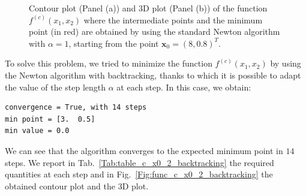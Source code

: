 \documentclass[a4paper,11pt]{article}
\begin{document}
	\begin{figure}[htb]
		\centering
		 \quad
		\caption{Contour plot (Panel (a)) and 3D plot (Panel (b)) of the function $f^{(c)}(x_{1},x_{2})$ where the intermediate points and the minimum point (in red) are obtained by using the standard Newton algorithm with $\alpha=1$, starting from the point $\textbf{x}_{0}=(8,0.8)^{T}$.}
		\label{Fig:func_c_x0_2}
	\end{figure}

\noindent To solve this problem, we tried to minimize the function $f^{(c)}(x_{1},x_{2})$ by using the Newton algorithm with backtracking, thanks to which it is possible to adapt the value of the step length $\alpha$ at each step. In this case, we obtain:
	\begin{verbatim}
convergence = True, with 14 steps
min point = [3.  0.5]
min value = 0.0
	\end{verbatim}
We can see that the algorithm converges to the expected minimum point in $14$ steps. We report in Tab.~\ref{Tab:table_c_x0_2_backtracking} the required quantities at each step and in Fig.~\ref{Fig:func_c_x0_2_backtracking} the obtained contour plot and the 3D plot.
\end{document}
